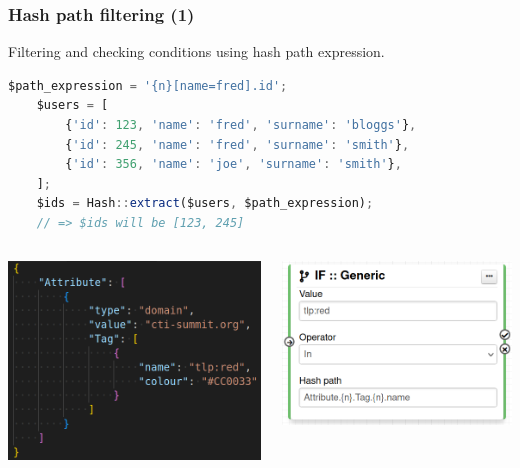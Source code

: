 \begin{frame}[fragile]
    \frametitle{Hash path filtering (1)}
    Filtering and checking conditions using hash path expression.
    \begin{lstlisting}[language=javascript,firstnumber=1]
    $path_expression = '{n}[name=fred].id';
    $users = [
        {'id': 123, 'name': 'fred', 'surname': 'bloggs'},
        {'id': 245, 'name': 'fred', 'surname': 'smith'},
        {'id': 356, 'name': 'joe', 'surname': 'smith'},
    ];
    $ids = Hash::extract($users, $path_expression);
    // => $ids will be [123, 245]
    \end{lstlisting}
    \begin{columns}
        \begin{column}{0.6\textwidth}
            \begin{center}
                \includegraphics[width=0.7\linewidth]{pictures/attribute-json.png}
            \end{center}
        \end{column}
        \begin{column}{0.4\textwidth}
            \includegraphics[width=1.0\linewidth]{pictures/module-if-generic.png}
        \end{column}
    \end{columns}
\end{frame}

